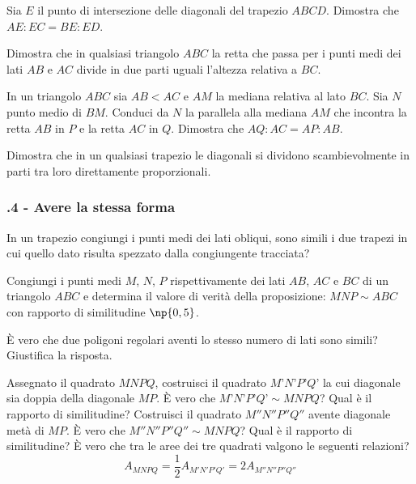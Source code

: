 \begin{multicols}{2}
\begin{esercizio}
\label{ese:6.47}
Sia $E$ il punto di intersezione delle diagonali del trapezio $ABCD$. Dimostra che $AE : EC = BE : ED$.
\end{esercizio}

\begin{esercizio}
\label{ese:6.48}
Dimostra che in qualsiasi triangolo $ABC$ la retta che passa per i punti medi dei lati $AB$ e $AC$ divide in due parti uguali l'altezza relativa a $BC$.
\end{esercizio}

\begin{esercizio}
\label{ese:6.49}
In un triangolo $ABC$ sia $AB<AC$ e $AM$ la mediana relativa al lato $BC$. Sia $N$ punto medio di $BM$. Conduci da $N$ la parallela alla mediana $AM$ che incontra la retta $AB$ in $P$ e la retta $AC$ in $Q$. Dimostra che $AQ : AC = AP : AB$.
\end{esercizio}

\begin{esercizio}
\label{ese:6.50}
Dimostra che in un qualsiasi trapezio le diagonali si dividono scambievolmente in parti tra loro direttamente proporzionali.
\end{esercizio}

\subsubsection*{\thechapter.4 - Avere la stessa forma}

\begin{esercizio}
\label{ese:6.51}
In un trapezio congiungi i punti medi dei lati obliqui, sono simili i due trapezi in cui quello dato risulta spezzato dalla congiungente tracciata? 
\end{esercizio}

\begin{esercizio}
\label{ese:6.52}
Congiungi i punti medi $M$, $N$, $P$ rispettivamente dei lati $AB$, $AC$ e $BC$ di un triangolo $ABC$ e determina il valore di verità della proposizione: $MNP\sim ABC$ con rapporto di similitudine $\np{0,5}$.
\end{esercizio}

\begin{esercizio}
\label{ese:6.53}
\`E vero che due poligoni regolari aventi lo stesso numero di lati sono simili? Giustifica la risposta.
\end{esercizio}

\begin{esercizio}
\label{ese:6.54}
Assegnato il quadrato $MNPQ$, costruisci il quadrato $M’N’P’Q’$ la cui diagonale sia doppia della diagonale $MP$. \`E vero che $M’N’P’Q’\sim MNPQ$? Qual è il rapporto di similitudine? Costruisci il quadrato $M''N''P''Q''$ avente diagonale metà di $MP$. \`E vero che $M''N''P''Q''\sim MNPQ$? Qual è il rapporto di similitudine? \`E vero che tra le aree dei tre quadrati valgono le seguenti relazioni?
\[A_{MNPQ}=\frac{1}{2}A_{M'N'P'Q'}=2A_{M''N''P''Q''} \]
\end{esercizio}


\end{multicols}
